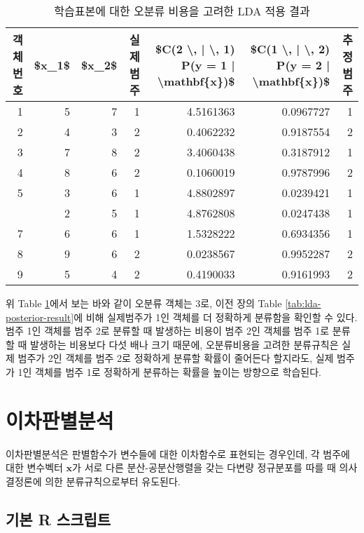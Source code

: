 \documentclass[]{book}
\begin{document}
\begin{table}[t]

\caption{\label{tab:lda-unequal-cost-result}학습표본에 대한 오분류 비용을 고려한 LDA 적용 결과}
\centering
\begin{tabular}{rrrrrrr}
\toprule
객체번호 & \$x\_1\$ & \$x\_2\$ & 실제범주 & \$C(2 \textbackslash{}, | \textbackslash{}, 1) P(y = 1 | \textbackslash{}mathbf\{x\})\$ & \$C(1 \textbackslash{}, | \textbackslash{}, 2) P(y = 2 | \textbackslash{}mathbf\{x\})\$ & 추정범주\\
\midrule
1 & 5 & 7 & 1 & 4.5161363 & 0.0967727 & 1\\
2 & 4 & 3 & 2 & 0.4062232 & 0.9187554 & 2\\
3 & 7 & 8 & 2 & 3.4060438 & 0.3187912 & 1\\
4 & 8 & 6 & 2 & 0.1060019 & 0.9787996 & 2\\
5 & 3 & 6 & 1 & 4.8802897 & 0.0239421 & 1\\
\addlinespace
6 & 2 & 5 & 1 & 4.8762808 & 0.0247438 & 1\\
7 & 6 & 6 & 1 & 1.5328222 & 0.6934356 & 1\\
8 & 9 & 6 & 2 & 0.0238567 & 0.9952287 & 2\\
9 & 5 & 4 & 2 & 0.4190033 & 0.9161993 & 2\\
\bottomrule
\end{tabular}
\end{table}

위 Table \ref{tab:lda-unequal-cost-result}에서 보는 바와 같이 오분류 객체는 3로, 이전 장의 Table \ref{tab:lda-posterior-result}에 비해 실제범주가 1인 객체를 더 정확하게 분류함을 확인할 수 있다. 범주 1인 객체를 범주 2로 분류할 때 발생하는 비용이 범주 2인 객체를 범주 1로 분류할 때 발생하는 비용보다 다섯 배나 크기 때문에, 오분류비용을 고려한 분류규칙은 실제 범주가 2인 객체를 범주 2로 정확하게 분류할 확률이 줄어든다 할지라도, 실제 범주가 1인 객체를 범주 1로 정확하게 분류하는 확률을 높이는 방향으로 학습된다.

\hypertarget{qda}{%
\section{이차판별분석}\label{qda}}

이차판별분석은 판별함수가 변수들에 대한 이차함수로 표현되는 경우인데, 각 범주에 대한 변수벡터 \(\mathbf{x}\)가 서로 다른 분산-공분산행렬을 갖는 다변량 정규분포를 따를 때 의사결정론에 의한 분류규칙으로부터 유도된다.

\hypertarget{qda-basic-script}{%
\subsection{기본 R 스크립트}\label{qda-basic-script}}
\end{document}
